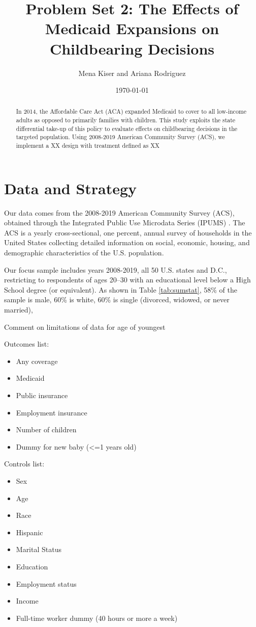 \documentclass{article}
\title{Problem Set 2: The Effects of Medicaid Expansions on Childbearing Decisions}
\author{Mena Kiser and Ariana Rodriguez}
\date{\today}
\begin{document}
\maketitle

\begin{abstract}
    In 2014, the Affordable Care Act (ACA) expanded Medicaid to cover to all low-income adults as opposed to primarily families with children. This study exploits the state differential take-up of this policy to evaluate effects on childbearing decisions in the targeted population. Using 2008-2019 American Community Survey (ACS), we implement a XX design with treatment defined as XX
\end{abstract}

\section{Data and Strategy}
Our data comes from the 2008-2019 American Community Survey (ACS), obtained through the Integrated Public Use Microdata Series (IPUMS) \citep{data:acs}. The ACS is a yearly cross-sectional, one percent, annual survey of households in the United States collecting detailed information on social, economic, housing, and demographic characteristics of the U.S. population.

Our focus sample includes years 2008-2019, all 50 U.S. states and D.C., restricting to respondents of ages 20--30 with an educational level below a High School degree (or equivalent). As shown in Table \ref{tab:sumstat}, 58\% of the sample is male, 60\% is white, 60\% is single (divorced, widowed, or never married), 

Comment on limitations of data for age of youngest 

Outcomes list:
\begin{itemize}
    \item Any coverage
    \item Medicaid
    \item Public insurance
    \item Employment insurance
    \item Number of children
    \item Dummy for new baby (<=1 years old)

\end{itemize}

Controls list:
\begin{itemize}
    \item Sex
    \item Age
    \item Race
    \item Hispanic
    \item Marital Status
    \item Education
    \item Employment status
    \item Income
    \item Full-time worker dummy (40 hours or more a week)
\end{itemize}
\end{document}
